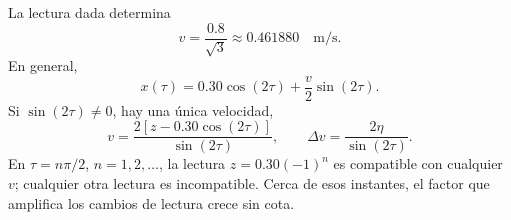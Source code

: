 La lectura dada determina
\[
v=\frac{0.8}{\sqrt3}\approx0.461880\quad\mathrm{m/s}.
\]
En general,
\[
x(\tau)=0.30\cos(2\tau)+\frac v2\sin(2\tau).
\]
Si \(\sin(2\tau)\ne0\), hay una única velocidad,
\[
v=\frac{2[z-0.30\cos(2\tau)]}{\sin(2\tau)},\qquad
\Delta v=\frac{2\eta}{\sin(2\tau)}.
\]
En \(\tau=n\pi/2\), \(n=1,2,\ldots\), la lectura \(z=0.30(-1)^n\) es compatible con cualquier \(v\); cualquier otra lectura es incompatible. Cerca de esos instantes, el factor que amplifica los cambios de lectura crece sin cota.
